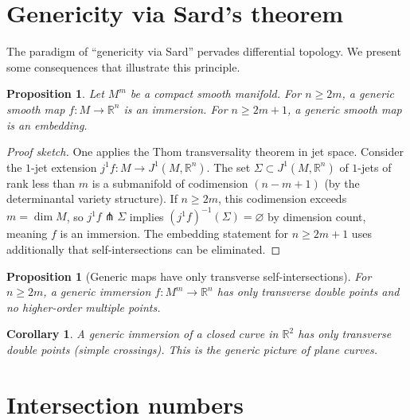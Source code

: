\documentclass[12pt,a4paper,openany]{book}
\newtheorem{proposition}[theorem]{Proposition}
\newtheorem{corollary}[theorem]{Corollary}
\theoremstyle{definition}
\theoremstyle{remark}
\newcommand{\R}{\mathbb{R}}
\begin{document}
\section{Genericity via Sard's theorem}\label{sec:genericity-sard}

The paradigm of ``genericity via Sard'' pervades differential topology.
We present some consequences that illustrate this principle.

\begin{proposition}\label{prop:generic-immersion-low-dim}
Let $M^m$ be a compact smooth manifold. For $n \geq 2m$, a generic smooth
map $f \colon M \to \R^n$ is an immersion. For $n \geq 2m + 1$, a generic
smooth map is an embedding.
\end{proposition}

\begin{proof}[Proof sketch]
One applies the Thom transversality theorem in jet space. Consider the
$1$-jet extension $j^1 f \colon M \to J^1(M, \R^n)$. The set
$\Sigma \subset J^1(M, \R^n)$ of $1$-jets of rank less than $m$ is a
submanifold of codimension $(n - m + 1)$ (by the determinantal variety
structure). If $n \geq 2m$, this codimension exceeds $m = \dim M$,
so $j^1 f \pitchfork \Sigma$ implies $(j^1 f)^{-1}(\Sigma) = \varnothing$
by dimension count, meaning $f$ is an immersion. The embedding statement
for $n \geq 2m + 1$ uses additionally that self-intersections can be
eliminated.
\end{proof}

\begin{proposition}[Generic maps have only transverse self-intersections]
\label{prop:generic-transverse-selfintersections}
For $n \geq 2m$, a generic immersion $f \colon M^m \to \R^n$ has only
transverse double points and no higher-order multiple points.
\end{proposition}

\begin{corollary}\label{cor:generic-curves-R2}
A generic immersion of a closed curve in $\R^2$ has only transverse
double points (simple crossings). This is the generic picture of
plane curves.
\end{corollary}

\section{Intersection numbers}\label{sec:intersection-numbers}
\end{document}
